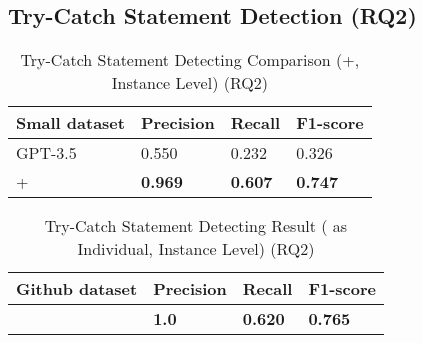 \subsection{Try-Catch Statement Detection (RQ2)}
\label{sec:rq2}

\begin{table}[t]%
  \caption{Try-Catch Statement Detecting Comparison ({\xblock}+{\xstate}, Instance Level) (RQ2)}
  \vspace{-12pt}
  \small
	\begin{center}
		\renewcommand{\arraystretch}{1}
		\begin{tabular}{| p{3.05cm}<{\centering} | p{1.2cm}<{\centering} | p{1.2cm}<{\centering}| p{1.2cm}<{\centering}|}
		  \hline
		Small dataset	  & Precision  & Recall & F1-score \\
			\hline
                        GPT-3.5 & 0.550 & 0.232 & 0.326 \\
			\hline
			\xblock + \xstate   & \textbf{0.969}  &  \textbf{0.607} & \textbf{0.747}\\
			\hline
		\end{tabular}
		\label{tab:xstate-1}
	\end{center}
\end{table}

\begin{table}[t]%
\caption{Try-Catch Statement Detecting Result ({\xstate} as Individual, Instance Level) (RQ2)}
  \vspace{-12pt}
  \small
	\begin{center}
		\renewcommand{\arraystretch}{1}
		\begin{tabular}{| p{3.05cm}<{\centering} | p{1.2cm}<{\centering} | p{1.2cm}<{\centering}| p{1.2cm}<{\centering}|}
		  \hline
		Github dataset	  & Precision  & Recall & F1-score \\
			\hline
			\hline
			\xstate  & \textbf{1.0}  &  \textbf{0.620} & \textbf{0.765}\\
			\hline
		\end{tabular}
		\label{tab:xstate-2}
	\end{center}
\end{table}

